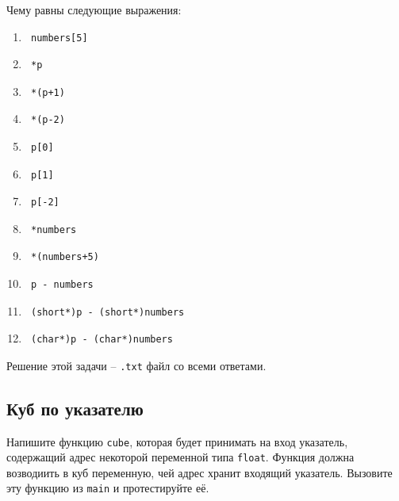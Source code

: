 \documentclass{article}
\begin{document}
Чему равны следующие выражения:
\begin{multicols}{3}
\begin{enumerate}
\item \begin{verbatim} numbers[5] \end{verbatim}
\item \begin{verbatim} *p \end{verbatim}
\item \begin{verbatim} *(p+1) \end{verbatim}
\item \begin{verbatim} *(p-2) \end{verbatim}
\item \begin{verbatim} p[0] \end{verbatim}
\item \begin{verbatim} p[1] \end{verbatim}
\item \begin{verbatim} p[-2] \end{verbatim}
\item \begin{verbatim} *numbers \end{verbatim}
\item \begin{verbatim} *(numbers+5) \end{verbatim}
\item \begin{verbatim} p - numbers \end{verbatim}
\item \begin{verbatim} (short*)p - (short*)numbers \end{verbatim}
\item \begin{verbatim} (char*)p - (char*)numbers \end{verbatim}
\end{enumerate}
\end{multicols}

Решение этой задачи -- \texttt{.txt} файл со всеми ответами.


\subsection{Куб по указателю}
Напишите функцию \texttt{cube}, которая будет принимать на вход указатель, содержащий адрес некоторой переменной типа \texttt{float}. Функция должна возводиить в куб переменную, чей адрес хранит входящий указатель. Вызовите эту функцию из \texttt{main} и протестируйте её.
\end{document}
